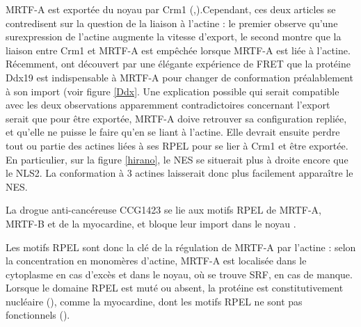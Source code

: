  MRTF-A est exportée du noyau par Crm1 (\cite{vartiainen_nuclear_2007},\cite{hayashi_differences_2013}).Cependant, ces deux articles se contredisent sur la question de la liaison à l'actine : le premier observe qu'une surexpression de l'actine augmente la vitesse d'export, le second montre que la liaison entre Crm1 et MRTF-A est empêchée lorsque MRTF-A est liée à l'actine. Récemment, \cite{rajakyla_rna_2015} ont découvert par une élégante expérience de FRET que la protéine Ddx19 est indispensable à MRTF-A pour changer de conformation préalablement à son import (voir figure \ref{Ddx}. Une explication possible qui serait compatible avec les deux observations apparemment contradictoires concernant l'export serait que pour être exportée, MRTF-A doive retrouver sa configuration repliée, et qu'elle ne puisse le faire qu'en se liant à l'actine. Elle devrait ensuite perdre tout ou partie des actines liées à ses RPEL pour se lier à Crm1 et être exportée. En particulier, sur la figure \ref{hirano}, le NES se situerait plus à droite encore que le NLS2. La conformation à 3 actines laisserait donc plus facilement apparaître le NES. 
 
 La drogue anti-cancéreuse CCG1423 se lie aux motifs RPEL de MRTF-A, MRTF-B et de la myocardine, et bloque leur import dans le noyau \cite{hayashi_2014}. 
 
 Les motifs RPEL sont donc la clé de la régulation de MRTF-A par l'actine : selon la concentration en monomères d'actine, MRTF-A est localisée dans le cytoplasme en cas d'excès et dans le noyau, où se trouve SRF, en cas de manque. Lorsque le domaine RPEL est muté ou absent, la protéine est constitutivement nucléaire (\cite{miralles_actin_2003}), comme la myocardine, dont les motifs RPEL ne sont pas fonctionnels (\cite{guettler_rpel_2008}). 
 
